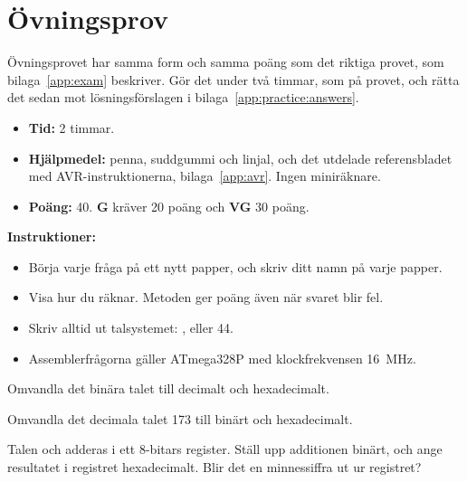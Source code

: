 
\chapter{Övningsprov}
\label{app:practice}

Övningsprovet har samma form och samma poäng som det riktiga provet, som bilaga~\ref{app:exam}
beskriver. Gör det under två timmar, som på provet, och rätta det sedan mot lösningsförslagen i
bilaga~\ref{app:practice:answers}.

\begin{itemize}
  \item \textbf{Tid:} 2 timmar.
  \item \textbf{Hjälpmedel:} penna, suddgummi och linjal, och det utdelade referensbladet med
    AVR-instruktionerna, bilaga~\ref{app:avr}. Ingen miniräknare.
  \item \textbf{Poäng:} 40. \textbf{G} kräver 20 poäng och \textbf{VG} 30 poäng.
\end{itemize}

\noindent\textbf{Instruktioner:}
\begin{itemize}
  \item Börja varje fråga på ett nytt papper, och skriv ditt namn på varje papper.
  \item Visa hur du räknar. Metoden ger poäng även när svaret blir fel.
  \item Skriv alltid ut talsystemet: ,  eller 44.
  \item Assemblerfrågorna gäller ATmega328P med klockfrekvensen 16~MHz.
\end{itemize}

\label{practice:q:1}

 Omvandla det binära talet  till decimalt och hexadecimalt. 

 Omvandla det decimala talet 173 till binärt och hexadecimalt. 

 Talen  och  adderas i ett 8-bitars register. Ställ upp additionen
binärt, och ange resultatet i registret hexadecimalt. Blir det en minnessiffra ut ur registret?

